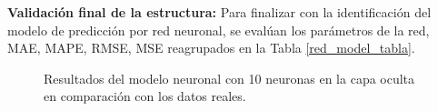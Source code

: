 \documentclass[12pt]{article}
\begin{document}
\textbf{Validación final de la estructura:}
Para finalizar con la identificación del modelo de predicción por red neuronal, se evalúan los parámetros de la red, MAE, MAPE, RMSE, MSE reagrupados en la Tabla \ref{red_model_tabla}.

\begin{figure}[h!]
	\centering
	\captionsetup{justification=centering}
\caption{Resultados del modelo neuronal con 10 neuronas en la capa oculta en comparación con los datos reales.}
\end{figure}
\end{document}
